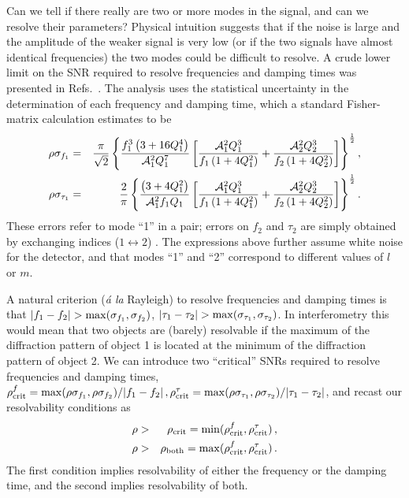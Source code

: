 \documentclass[]{iopart}
\def\beq{\begin{eqnarray}}
\def\eeq{\end{eqnarray}}
\def\f{\frac}
\def\f{\frac}
\begin{document}
Can we tell if there really are two or more modes in the signal, and can we
resolve their parameters? Physical intuition suggests that if the noise is
large and the amplitude of the weaker signal is very low (or if the two
signals have almost identical frequencies) the two modes could be difficult to
resolve. A crude lower limit on the SNR required to resolve frequencies and
damping times was presented in Refs.~\cite{Berti:2005ys,Berti:2007zu}. The
analysis uses the statistical uncertainty in the determination of each
frequency and damping time, which a standard Fisher-matrix calculation
estimates to be \cite{Berti:2005ys}
%
\beq
\rho \sigma_{f_1}&=&
\f{\pi}{\sqrt{2}}
\left\{
\f{f_1^3\left(3+16Q_1^4\right)}{{\cal A}_1^2 Q_1^7}
\left[
\f{{\cal A}_1^2 Q_1^3}{f_1\left(1+4Q_1^2\right)}+
\f{{\cal A}_2^2 Q_2^3}{f_2\left(1+4Q_2^2\right)}
\right] \right\}^{\f{1}{2}},\label{sigmaffh}\\
\rho \sigma_{\tau_1}&=& \f{2}{\pi} \left\{ \f{\left(3+4Q_1^2\right)}{{\cal A}_1^2 f_1 Q_1} \left[ \f{{\cal
A}_1^2 Q_1^3}{f_1\left(1+4Q_1^2\right)}+ \f{{\cal A}_2^2 Q_2^3}{f_2\left(1+4Q_2^2\right)} \right]
\right\}^{\f{1}{2}}. \eeq
%
These errors refer to mode ``1'' in a pair; errors on $f_2$ and $\tau_2$ are
simply obtained by exchanging indices ($1\leftrightarrow 2$)
\cite{Berti:2005ys,Berti:2007zu}. The expressions above further assume
white noise for the detector, and that modes ``1'' and ``2'' correspond to
different values of $l$ or $m$.

A natural criterion ({\it \'a la} Rayleigh) to resolve frequencies and damping
times is that $|f_1-f_2|>{\rm max}(\sigma_{f_1},\sigma_{f_2})$,
$|\tau_1-\tau_2|>{\rm max}(\sigma_{\tau_1},\sigma_{\tau_2})$.  
%
In interferometry this would mean that two objects are (barely) resolvable if
the maximum of the diffraction pattern of object 1 is located at the minimum
of the diffraction pattern of object 2. We can introduce two ``critical'' SNRs
required to resolve frequencies and damping times,
%
$\rho_{\rm crit}^f =
{\rm max}(\rho \sigma_{f_1},\rho \sigma_{f_2})/|f_1-f_2|\,,
\rho_{\rm crit}^\tau = 
{\rm max}(\rho \sigma_{\tau_1},\rho \sigma_{\tau_2})/|\tau_1-\tau_2|$,
%
and recast our resolvability conditions as
%
\beq \label{minimal}
\rho&>&
\rho_{\rm crit}
={\rm min}(\rho_{\rm crit}^f,\rho_{\rm crit}^\tau)\,,\\
\label{both}
\rho&>&
\rho_{\rm both}
={\rm max}(\rho_{\rm crit}^f,\rho_{\rm crit}^\tau)\,. \eeq
%
The first condition implies resolvability of either the frequency or the
damping time, and the second implies resolvability of both.
\end{document}
